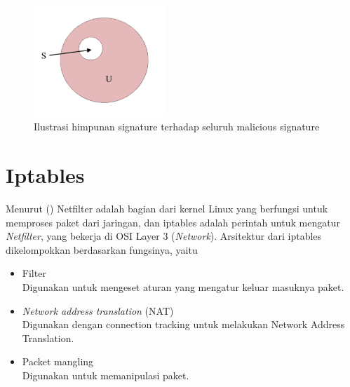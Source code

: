 \begin{figure}[H]
	\centering
	\includegraphics[width=190px]{resources/signature_illustration.png}
	\caption{Ilustrasi himpunan signature terhadap seluruh malicious signature}
	\label{fig:signature_illust}
\end{figure}


\section{Iptables}

Menurut (\cite{purdy2004linux}) Netfilter adalah bagian dari kernel Linux yang berfungsi untuk memproses paket dari jaringan, dan iptables adalah perintah untuk mengatur \textit{Netfilter}, yang bekerja di OSI Layer 3 (\textit{Network}). Arsitektur dari iptables dikelompokkan berdasarkan fungsinya, yaitu
\begin{itemize}
	\item Filter\\
	Digunakan untuk mengeset aturan yang mengatur keluar masuknya paket.
	\item \textit{Network address translation} (NAT)\\
	Digunakan dengan connection tracking untuk melakukan Network Address Translation.
	\item Packet mangling\\
	Digunakan untuk memanipulasi paket.	
\end{itemize} 

